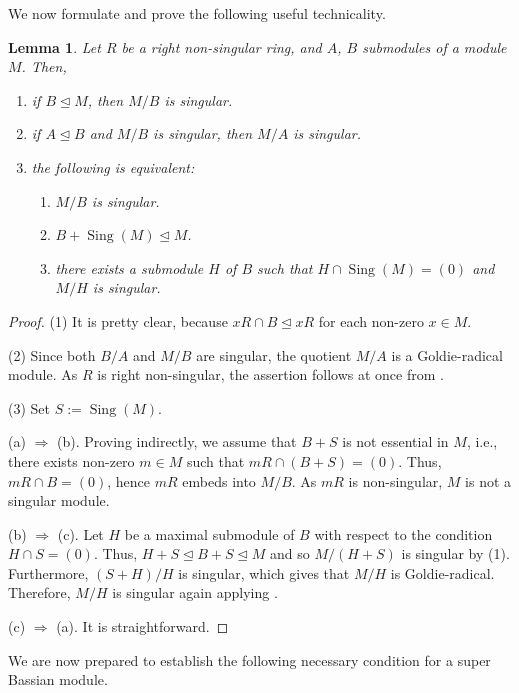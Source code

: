 \documentclass{amsart}
\newtheorem{lm}[thm]{Lemma}
\theoremstyle{definition}
\DeclareMathOperator{\Sing}{{Sing}}
\begin{document}
\medskip

We now formulate and prove the following useful technicality.

\begin{lm}\label{sing} Let $R$ be a right non-singular ring, and $A$, $B$ submodules of a module $M$. Then,
\begin{enumerate}
\item[(1)] if $B\trianglelefteq M$, then $M/B$ is singular.
\item[(2)] if $A\trianglelefteq B$ and $M/B$ is singular, then $M/A$ is singular.
\item[(3)] the following is equivalent:
\begin{enumerate}
\item[(a)] $M/B$ is singular.
\item[(b)] $B+\Sing(M)\trianglelefteq M$.
\item[(c)] there exists a submodule $H$ of $B$ such that $H\cap\Sing(M)=(0)$ and $M/H$ is singular.
 \end{enumerate}
 \end{enumerate}
\end{lm}

\begin{proof} (1) It is pretty clear, because $xR\cap B\trianglelefteq xR$ for each non-zero $x\in M$.

(2) Since both $B/A$ and $M/B$ are singular, the quotient $M/A$ is a Goldie-radical module. As $R$ is right non-singular, the assertion follows at once from \cite[Remark 11.3]{T}.

(3) Set $S:=\Sing(M)$.

(a) $\Rightarrow$ (b). Proving indirectly, we assume that $B+S$ is not essential in $M$, i.e., there exists non-zero $m\in M$ such that $mR\cap(B+S)=(0)$. Thus, $mR\cap B=(0)$, hence $mR$ embeds into $M/B$. As $mR$ is non-singular, $M$ is not a singular module.

(b) $\Rightarrow$ (c). Let $H$ be a maximal submodule of $B$ with respect to the condition $H\cap S=(0)$. Thus, $H+S\trianglelefteq B+S \trianglelefteq M$ and so $M/(H+S)$ is singular by (1). Furthermore, $(S+H)/H$ is singular, which gives that $M/H$ is Goldie-radical. Therefore, $M/H$ is singular again applying \cite[Remark 11.3]{T}.

(c) $\Rightarrow$ (a). It is straightforward.
\end{proof}

We are now prepared to establish the following necessary condition for a super Bassian module.
\end{document}
